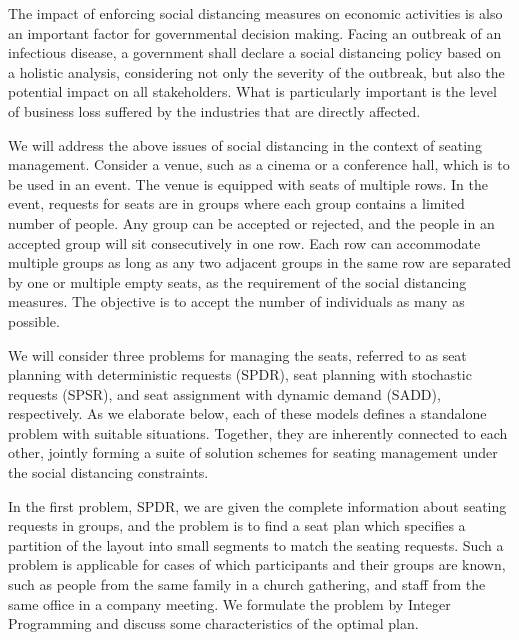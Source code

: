 The impact of enforcing social distancing measures on economic activities is also an important factor for governmental decision making. Facing an outbreak of an infectious disease, a government shall declare a social distancing policy based on a holistic analysis, considering not only the severity of the outbreak, but also the potential impact on all stakeholders. What is particularly important is the level of business loss suffered by the industries that are directly affected.  



We will address the above issues of social distancing in the context of seating management. Consider a venue, such as a cinema or a conference hall, which is to be used in an event. The venue is equipped with seats of multiple rows. In the event, requests for seats are in groups where each group contains a limited number of people. Any group can be accepted or rejected, and the people in an accepted group  will sit consecutively in one row. Each row can accommodate multiple groups as long as any two adjacent groups in the same row are separated by one or multiple empty seats, as the requirement of the social distancing measures. The objective is to accept the number of individuals as many as possible.

We will consider three problems for managing the seats, referred to as seat planning with deterministic requests (SPDR), seat planning with stochastic requests (SPSR), and seat assignment with dynamic demand (SADD), respectively. As we elaborate below, each of these models defines a standalone problem with suitable situations. Together, they are inherently connected to each other, jointly forming a suite of solution schemes for seating management under the social distancing constraints.

In the first problem, SPDR, we are given the complete information about seating requests in groups, and the problem is to find a seat plan which specifies a partition of the layout into small segments to match the seating requests. Such a problem is applicable for cases of which participants and their groups are known, such as people from the same family in a church gathering, and staff from the same office in a company meeting. We formulate the problem by Integer Programming and discuss some characteristics of the optimal plan.
 

